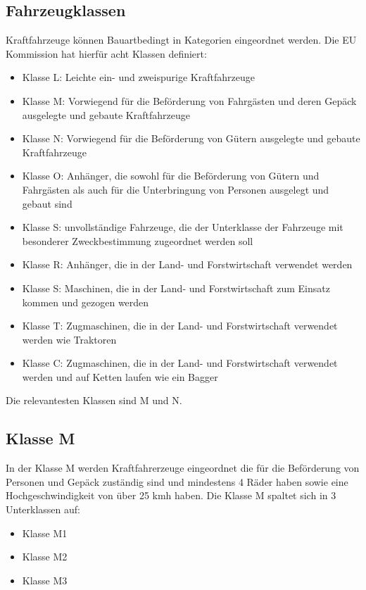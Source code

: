 \subsection{Fahrzeugklassen}

Kraftfahrzeuge können Bauartbedingt in Kategorien eingeordnet werden.
Die EU Kommission hat hierfür acht Klassen definiert\cite{VERORDNUNG}:

\begin{itemize}
	\item Klasse L: Leichte ein- und zweispurige Kraftfahrzeuge
	\item Klasse M: Vorwiegend für die Beförderung von Fahrgästen und deren Gepäck ausgelegte und gebaute Kraftfahrzeuge
	\item Klasse N: Vorwiegend für die Beförderung von Gütern ausgelegte und gebaute Kraftfahrzeuge
	\item Klasse O: Anhänger, die sowohl für die Beförderung von Gütern und Fahrgästen als auch für die Unterbringung von Personen ausgelegt und gebaut sind
	\item Klasse S: unvollständige Fahrzeuge, die der Unterklasse der Fahrzeuge mit besonderer Zweckbestimmung zugeordnet werden soll
	\item Klasse R: Anhänger, die in der Land- und Forstwirtschaft verwendet werden
	\item Klasse S: Maschinen, die in der Land- und Forstwirtschaft zum Einsatz kommen und gezogen werden
	\item Klasse T: Zugmaschinen, die in der Land- und Forstwirtschaft verwendet werden wie Traktoren
	\item Klasse C: Zugmaschinen, die in der Land- und Forstwirtschaft verwendet werden und auf Ketten laufen wie ein Bagger
\end{itemize}

Die relevantesten Klassen sind M und N.

\subsection*{Klasse M}
In der Klasse M werden Kraftfahrerzeuge eingeordnet die für die Beförderung von Personen und Gepäck zuständig sind und mindestens 4 Räder haben sowie eine Hochgeschwindigkeit von über 25 \ac{kmh} haben.
\newline
Die Klasse M spaltet sich in 3 Unterklassen auf:
\begin{itemize}
	\item {Klasse M1}
	\item {Klasse M2}
	\item {Klasse M3}
\end{itemize}
